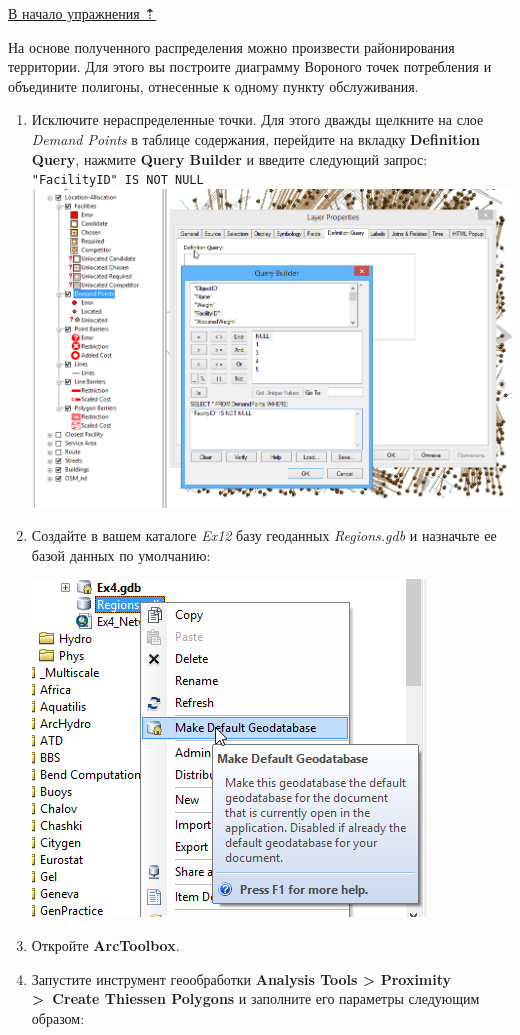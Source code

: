 \documentclass[12pt,]{book}
\begin{document}
\protect\hyperlink{network-analysis}{В начало упражнения ⇡}

На основе полученного распределения можно произвести районирования территории. Для этого вы построите диаграмму Вороного точек потребления и объедините полигоны, отнесенные к одному пункту обслуживания.

\begin{enumerate}
\def\labelenumi{\arabic{enumi}.}
\item
  Исключите нераспределенные точки. Для этого дважды щелкните на слое \emph{Demand Points} в таблице содержания, перейдите на вкладку \textbf{Definition Query}, нажмите \textbf{Query Builder} и введите следующий запрос:
  \texttt{"FacilityID"\ IS\ NOT\ NULL}
  \includegraphics{images/Ex12/image28.png}
\item
  Создайте в вашем каталоге \emph{Ex12} базу геоданных \emph{Regions.gdb} и назначьте ее базой данных по умолчанию:

  \includegraphics{images/Ex12/image29.png}
\item
  Откройте \textbf{ArcToolbox}.
\item
  Запустите инструмент геообработки \textbf{Analysis Tools \textgreater{} Proximity \textgreater{}~Create Thiessen Polygons} и заполните его параметры следующим образом:


\end{enumerate}
\end{document}

